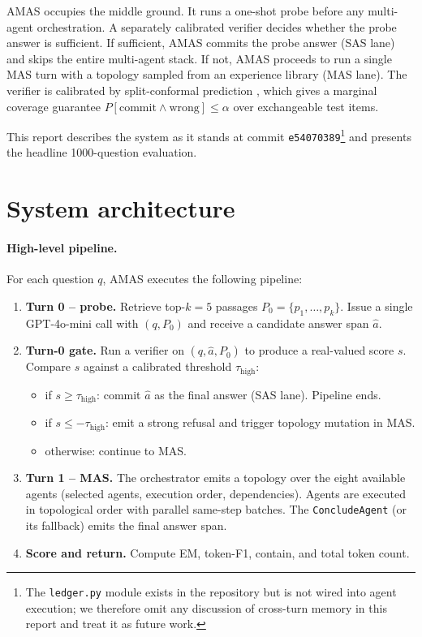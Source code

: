 \documentclass[11pt]{article}
\newcommand{\amas}{AMAS\xspace}
\newcommand{\sas}{SAS\xspace}
\newcommand{\mas}{MAS\xspace}
\newcommand{\code}[1]{\texttt{\small #1}}
\begin{document}
\amas occupies the middle ground. It runs a one-shot probe before any
multi-agent orchestration. A separately calibrated verifier decides whether
the probe answer is sufficient. If sufficient, \amas commits the probe answer
(\sas lane) and skips the entire multi-agent stack. If not, \amas proceeds to
run a single \mas turn with a topology sampled from an experience library
(\mas lane). The verifier is calibrated by split-conformal prediction
\cite{conformal-prediction}, which gives a marginal coverage guarantee
$P[\text{commit} \wedge \text{wrong}] \leq \alpha$ over exchangeable test
items.

This report describes the system as it stands at commit
\code{e54070389}\footnote{The \texttt{ledger.py} module exists in the
repository but is not wired into agent execution; we therefore omit any
discussion of cross-turn memory in this report and treat it as future
work.} and presents the headline 1000-question evaluation.

\section{System architecture}
\label{sec:arch}

\paragraph{High-level pipeline.}
For each question $q$, \amas executes the following pipeline:

\begin{enumerate}[leftmargin=*,nosep]
  \item \textbf{Turn 0 -- probe.} Retrieve top-$k=5$ passages
        $P_0=\{p_1,\dots,p_k\}$. Issue a single GPT-4o-mini call with
        $(q, P_0)$ and receive a candidate answer span $\hat{a}$.
  \item \textbf{Turn-0 gate.} Run a verifier on $(q, \hat{a}, P_0)$ to
        produce a real-valued score $s$. Compare $s$ against a calibrated
        threshold $\tau_{\text{high}}$:
        \begin{itemize}[leftmargin=2em,nosep]
          \item if $s \geq \tau_{\text{high}}$: commit $\hat{a}$ as the final
                answer (\sas lane). Pipeline ends.
          \item if $s \leq -\tau_{\text{high}}$: emit a strong refusal and
                trigger topology mutation in \mas.
          \item otherwise: continue to \mas.
        \end{itemize}
  \item \textbf{Turn 1 -- \mas.} The orchestrator emits a topology over the
        eight available agents (selected agents, execution order,
        dependencies). Agents are executed in topological order with parallel
        same-step batches. The \code{ConcludeAgent} (or its fallback) emits
        the final answer span.
  \item \textbf{Score and return.} Compute EM, token-F1, contain, and total
        token count.
\end{enumerate}
\end{document}
